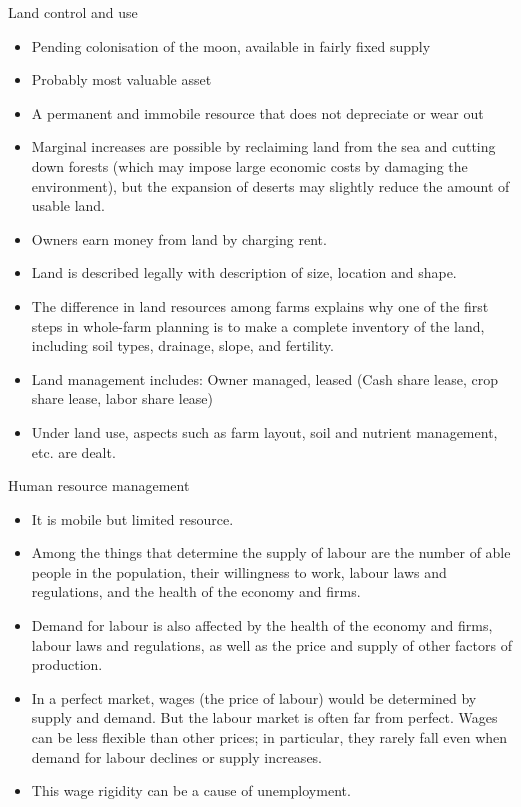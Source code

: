 \documentclass[12pt,ignorenonframetext,aspectratio=169]{beamer}
\providecommand{\tightlist}{%
  \setlength{\itemsep}{0pt}\setlength{\parskip}{0pt}}
\begin{document}
\begin{frame}{Land control and use}
\protect\hypertarget{land-control-and-use}{}
\begin{itemize}
\tightlist
\item
  Pending colonisation of the moon, available in fairly fixed supply
\item
  Probably most valuable asset
\item
  A permanent and immobile resource that does not depreciate or wear out
\item
  Marginal increases are possible by reclaiming land from the sea and
  cutting down forests (which may impose large economic costs by
  damaging the environment), but the expansion of deserts may slightly
  reduce the amount of usable land.
\item
  Owners earn money from land by charging rent.
\end{itemize}
\end{frame}

\begin{frame}{}
\protect\hypertarget{section-4}{}
\begin{itemize}
\tightlist
\item
  Land is described legally with description of size, location and
  shape.
\item
  The difference in land resources among farms explains why one of the
  first steps in whole-farm planning is to make a complete inventory of
  the land, including soil types, drainage, slope, and fertility.
\item
  Land management includes: Owner managed, leased (Cash share lease,
  crop share lease, labor share lease)
\item
  Under land use, aspects such as farm layout, soil and nutrient
  management, etc. are dealt.
\end{itemize}
\end{frame}

\begin{frame}{Human resource management}
\protect\hypertarget{human-resource-management}{}
\begin{itemize}
\tightlist
\item
  It is mobile but limited resource.
\item
  Among the things that determine the supply of labour are the number of
  able people in the population, their willingness to work, labour laws
  and regulations, and the health of the economy and firms.
\item
  Demand for labour is also affected by the health of the economy and
  firms, labour laws and regulations, as well as the price and supply of
  other factors of production.
\item
  In a perfect market, wages (the price of labour) would be determined
  by supply and demand. But the labour market is often far from perfect.
  Wages can be less flexible than other prices; in particular, they
  rarely fall even when demand for labour declines or supply increases.
\item
  This wage rigidity can be a cause of unemployment.
\end{itemize}
\end{frame}
\end{document}

